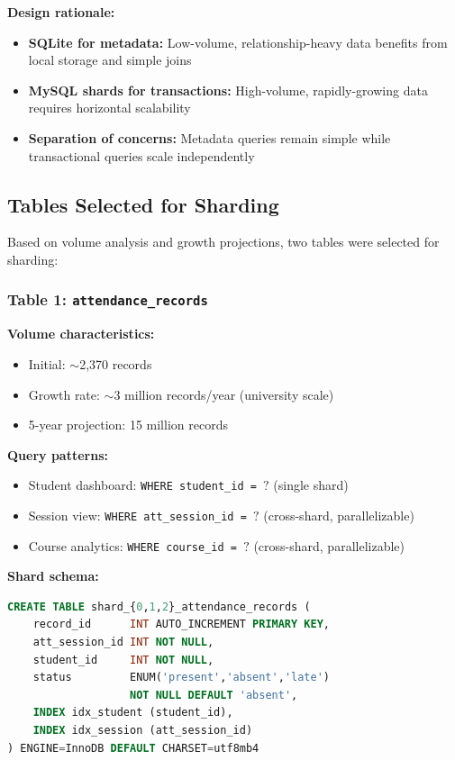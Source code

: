\documentclass[conference]{IEEEtran}
\begin{document}
\textbf{Design rationale:}
\begin{itemize}
    \item \textbf{SQLite for metadata:} Low-volume, relationship-heavy data benefits from local storage and simple joins
    \item \textbf{MySQL shards for transactions:} High-volume, rapidly-growing data requires horizontal scalability
    \item \textbf{Separation of concerns:} Metadata queries remain simple while transactional queries scale independently
\end{itemize}

\subsection{Tables Selected for Sharding}

Based on volume analysis and growth projections, two tables were selected for sharding:

\subsubsection{Table 1: \texttt{attendance\_records}}

\textbf{Volume characteristics:}
\begin{itemize}
    \item Initial: $\sim$2,370 records
    \item Growth rate: $\sim$3 million records/year (university scale)
    \item 5-year projection: 15 million records
\end{itemize}

\textbf{Query patterns:}
\begin{itemize}
    \item Student dashboard: \texttt{WHERE student\_id = }$?$ (single shard)
    \item Session view: \texttt{WHERE att\_session\_id = }$?$ (cross-shard, parallelizable)
    \item Course analytics: \texttt{WHERE course\_id = }$?$ (cross-shard, parallelizable)
\end{itemize}

\textbf{Shard schema:}
\begin{lstlisting}[language=SQL]
CREATE TABLE shard_{0,1,2}_attendance_records (
    record_id      INT AUTO_INCREMENT PRIMARY KEY,
    att_session_id INT NOT NULL,
    student_id     INT NOT NULL,
    status         ENUM('present','absent','late') 
                   NOT NULL DEFAULT 'absent',
    INDEX idx_student (student_id),
    INDEX idx_session (att_session_id)
) ENGINE=InnoDB DEFAULT CHARSET=utf8mb4
\end{lstlisting}
\end{document}
